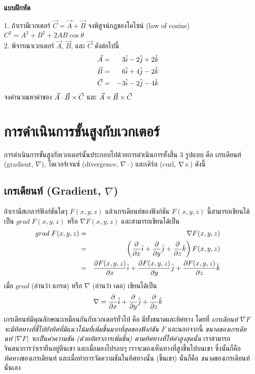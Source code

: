 \begin{center}
\Large{\textbf{แบบฝึกหัด}}\\
\end{center}
1. ถ้าเรามีเวกเตอร์ $\vec{C} = \vec{A} + \vec{B}$ จงพิสูจน์กฎของโคไซน์ (law of cosine) \\
$C^2 = A^2 + B^2 + 2AB\cos\theta$\\
2. พิจารณาเวกเตอร์ $\vec{A}$, $\vec{B}$, และ $\vec{C}$ ดังต่อไปนี้
\begin{eqnarray}\label{Excercise01}
\vec{A} &=& 3\hat{i} - 2\hat{j} + 2\hat{k} \nonumber \\
\vec{B} &=& 6\hat{i} + 4\hat{j} - 2\hat{k} \nonumber \\
\vec{C} &=& -3\hat{i} - 2\hat{j} - 4\hat{k} \nonumber
\end{eqnarray}
จงคำนวณหาค่าของ $\vec{A}\cdot\vec{B}\times\vec{C}$ และ $\vec{A}\times\vec{B}\times\vec{C}$

\section{การดำเนินการขั้นสูงกับเวกเตอร์}

การดำเนินการขั้นสูงกับเวกเตอร์นั้นประกอบไปด้วยการดำเนินการทั้งสิ้น 3 รูปแบบ คือ เกรเดียนท์ (gradient, $\nabla$), ไดเวอร์เจนซ์ (divergence, $\nabla\cdot$) และเคิร์ล (curl, $\nabla\times$) ดังนี้

\subsection{เกรเดียนท์ (Gradient, $\nabla$)}

ถ้าเรามีสเกลาร์ฟังก์ชันใดๆ $F(x, y, z)$ แล้วเกรเดียนท์ของฟังก์ชัน $F(x, y, z)$ นี้สามารถเขียนได้เป็น $grad \;F(x, y, z)$ หรือ $\nabla F(x, y, z)$ และสามารถเขียนได้เป็น
\begin{eqnarray}\label{GradF}
grad \;F(x, y, z) &=& \nabla F(x, y, z) \nonumber \\
        &=& \left(\frac{\partial}{\partial x}\hat{i} + \frac{\partial}{\partial y}\hat{j} + \frac{\partial}{\partial z}\hat{k}\right) F(x, y, z) \nonumber \\
        &=& \frac{\partial F(x, y, z)}{\partial x}\hat{i} + \frac{\partial F(x, y, z)}{\partial y}\hat{j} + \frac{\partial F(x, y, z)}{\partial z}\hat{k}
\end{eqnarray}
เมื่อ $grad$ (อ่านว่า แกรด) หรือ $\nabla$ (อ่านว่า เดล) เขียนได้เป็น
\begin{equation}\label{NablaDef}
\nabla = \frac{\partial}{\partial x}\hat{i} + \frac{\partial}{\partial y}\hat{j} + \frac{\partial}{\partial z}\hat{k}
\end{equation}
เกรเดียนท์มีคุณลักษณะเหมือนกันกับเวกเตอร์ทั่วไป คือ มีทั้งขนาดและทิศทาง โดยที่ \emph{เกรเดียนท์ $\nabla F$ จะมีทิศทางที่ชี้ไปยังทิศที่มีแนวโน้มที่เพิ่มขึ้นมากที่สุดของฟังก์ชัน $F$} และนอกจากนี้ \emph{ขนาดของเกรเดียนท์ $|\nabla F|$ จะเป็นค่าความชัน (ด้วยอัตราการเพิ่มขึ้น) ตามทิศทางที่ให้ค่าสูงสุดนั้น} เราสามารถจินตนาการว่าเรายืนอยู่ตีนเขา และเมื่อมองไปรอบๆ เราจะมองเห็นทางที่สูงขึ้นไปบนเขา ซึ่งนั้นก็คือ \emph{ทิศทาง}ของเกรเดียนท์ และเมื่อทำการวัดความชันในทิศทางนั้น (ขึ้นเขา) นั่นก็คือ \emph{ขนาด}ของเกรเดียนท์ นั่นเอง

